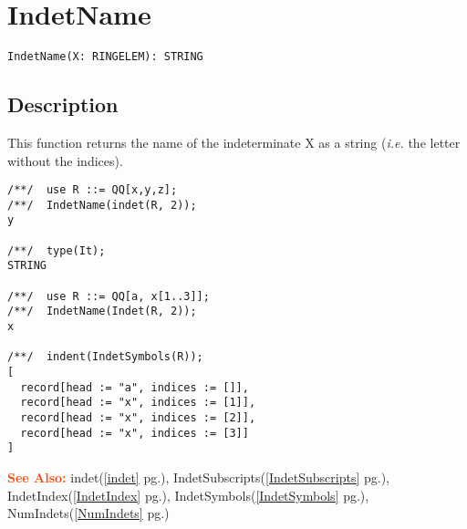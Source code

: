 \documentclass[a4paper]{mybook}
\newenvironment{command}{}{} %
\newcommand\SeeAlso{\par\textcolor{OrangeRed}{\textbf{\large See Also: }}}
\begin{document}
\section{IndetName}
\label{IndetName}
\begin{command} %


\begin{Verbatim}[label=syntax, rulecolor=\color{MidnightBlue},
frame=single]
IndetName(X: RINGELEM): STRING
\end{Verbatim}


\subsection*{Description}

This function returns the name of the indeterminate X as a string
(\textit{i.e.} the letter without the indices).
\begin{Verbatim}[label=example, rulecolor=\color{PineGreen}, frame=single]
/**/  use R ::= QQ[x,y,z];
/**/  IndetName(indet(R, 2));
y

/**/  type(It);
STRING

/**/  use R ::= QQ[a, x[1..3]];
/**/  IndetName(Indet(R, 2));
x

/**/  indent(IndetSymbols(R));
[
  record[head := "a", indices := []],
  record[head := "x", indices := [1]],
  record[head := "x", indices := [2]],
  record[head := "x", indices := [3]]
]
\end{Verbatim}


\SeeAlso %
  indet(\ref{indet} pg.\pageref{indet}), 
    IndetSubscripts(\ref{IndetSubscripts} pg.\pageref{IndetSubscripts}), 
    IndetIndex(\ref{IndetIndex} pg.\pageref{IndetIndex}), 
    IndetSymbols(\ref{IndetSymbols} pg.\pageref{IndetSymbols}), 
    NumIndets(\ref{NumIndets} pg.\pageref{NumIndets})
\end{command} %
\end{document}
